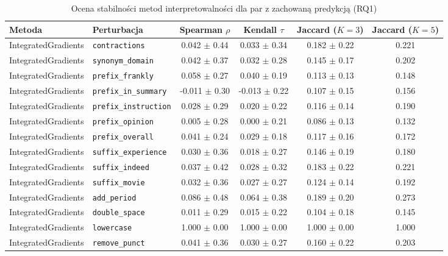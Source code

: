 \begin{table}[htbp]
\centering
\caption{Ocena stabilności metod interpretowalności dla par z zachowaną predykcją (RQ1)}
\label{tab:rq1_stability}
\begin{tabular}{llcccc}
\hline
\textbf{Metoda} & \textbf{Perturbacja} & \textbf{Spearman $\rho$} & \textbf{Kendall $\tau$} & \textbf{Jaccard ($K=3$)} & \textbf{Jaccard ($K=5$)} \\
\hline
IntegratedGradients & \texttt{contractions} & 0.042 $\pm$ 0.44 & 0.033 $\pm$ 0.34 & 0.182 $\pm$ 0.22 & 0.221 \\
IntegratedGradients & \texttt{synonym\_domain} & 0.042 $\pm$ 0.37 & 0.032 $\pm$ 0.28 & 0.145 $\pm$ 0.17 & 0.202 \\
IntegratedGradients & \texttt{prefix\_frankly} & 0.058 $\pm$ 0.27 & 0.040 $\pm$ 0.19 & 0.113 $\pm$ 0.13 & 0.148 \\
IntegratedGradients & \texttt{prefix\_in\_summary} & -0.011 $\pm$ 0.30 & -0.013 $\pm$ 0.22 & 0.107 $\pm$ 0.15 & 0.156 \\
IntegratedGradients & \texttt{prefix\_instruction} & 0.028 $\pm$ 0.29 & 0.020 $\pm$ 0.22 & 0.116 $\pm$ 0.14 & 0.190 \\
IntegratedGradients & \texttt{prefix\_opinion} & 0.005 $\pm$ 0.28 & 0.000 $\pm$ 0.21 & 0.086 $\pm$ 0.13 & 0.132 \\
IntegratedGradients & \texttt{prefix\_overall} & 0.041 $\pm$ 0.24 & 0.029 $\pm$ 0.18 & 0.117 $\pm$ 0.16 & 0.172 \\
IntegratedGradients & \texttt{suffix\_experience} & 0.030 $\pm$ 0.36 & 0.018 $\pm$ 0.27 & 0.146 $\pm$ 0.19 & 0.180 \\
IntegratedGradients & \texttt{suffix\_indeed} & 0.037 $\pm$ 0.42 & 0.028 $\pm$ 0.32 & 0.183 $\pm$ 0.22 & 0.221 \\
IntegratedGradients & \texttt{suffix\_movie} & 0.032 $\pm$ 0.36 & 0.027 $\pm$ 0.27 & 0.124 $\pm$ 0.14 & 0.192 \\
IntegratedGradients & \texttt{add\_period} & 0.086 $\pm$ 0.48 & 0.064 $\pm$ 0.38 & 0.189 $\pm$ 0.20 & 0.273 \\
IntegratedGradients & \texttt{double\_space} & 0.011 $\pm$ 0.29 & 0.015 $\pm$ 0.22 & 0.104 $\pm$ 0.18 & 0.145 \\
IntegratedGradients & \texttt{lowercase} & 1.000 $\pm$ 0.00 & 1.000 $\pm$ 0.00 & 1.000 $\pm$ 0.00 & 1.000 \\
IntegratedGradients & \texttt{remove\_punct} & 0.041 $\pm$ 0.36 & 0.030 $\pm$ 0.27 & 0.160 $\pm$ 0.22 & 0.203 \\

\end{tabular}
\end{table}
